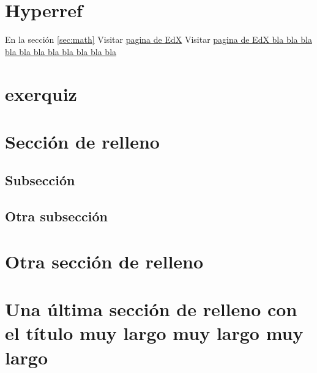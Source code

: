 \documentclass[12pt,a4paper,twoside]{article}
\begin{document}
\section{Hyperref}

En la sección \ref{sec:math} 
Visitar \href{https://edx.org}{pagina de EdX}
Visitar \href{https://edx.org}{pagina de EdX bla bla bla bla bla bla bla bla bla bla bla}

\section{exerquiz}
%
%
%
%

\section{Sección de relleno}

\lipsum[1-15]

\subsection{Subsección}

\lipsum[1-15]

\subsection{Otra subsección}

\lipsum[1-15]		

\section{Otra sección de relleno}

\lipsum[1-15]		

\section{Una última sección de relleno con el título muy largo muy largo muy largo}

\lipsum[1-15]
\end{document}
